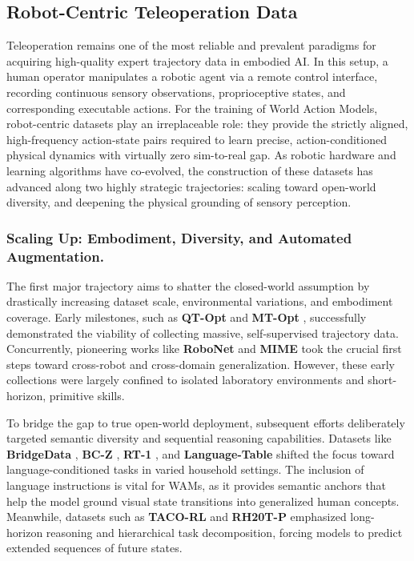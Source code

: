 \subsection{Robot-Centric Teleoperation Data}
\label{sec:data_robot}
Teleoperation remains one of the most reliable and prevalent paradigms for acquiring high-quality expert trajectory data in embodied AI. In this setup, a human operator manipulates a robotic agent via a remote control interface, recording continuous sensory observations, proprioceptive states, and corresponding executable actions. For the training of World Action Models, robot-centric datasets play an irreplaceable role: they provide the strictly aligned, high-frequency action-state pairs required to learn precise, action-conditioned physical dynamics with virtually zero sim-to-real gap. As robotic hardware and learning algorithms have co-evolved, the construction of these datasets has advanced along two highly strategic trajectories: scaling toward open-world diversity, and deepening the physical grounding of sensory perception.


\subsubsection{Scaling Up: Embodiment, Diversity, and Automated Augmentation.} 
The first major trajectory aims to shatter the closed-world assumption by drastically increasing dataset scale, environmental variations, and embodiment coverage. Early milestones, such as \textbf{QT-Opt} \cite{QT-Opt} and \textbf{MT-Opt} \cite{MT-Opt}, successfully demonstrated the viability of collecting massive, self-supervised trajectory data. Concurrently, pioneering works like \textbf{RoboNet} \cite{RoboNet} and \textbf{MIME} \cite{MIME} took the crucial first steps toward cross-robot and cross-domain generalization. However, these early collections were largely confined to isolated laboratory environments and short-horizon, primitive skills.

To bridge the gap to true open-world deployment, subsequent efforts deliberately targeted semantic diversity and sequential reasoning capabilities. Datasets like \textbf{BridgeData} \cite{Bridge}, \textbf{BC-Z} \cite{BC-Z}, \textbf{RT-1} \cite{RT-1}, and \textbf{Language-Table} \cite{Language-Table} shifted the focus toward language-conditioned tasks in varied household settings. The inclusion of language instructions is vital for WAMs, as it provides semantic anchors that help the model ground visual state transitions into generalized human concepts. Meanwhile, datasets such as \textbf{TACO-RL} \cite{TACO-RL-Real-World} and \textbf{RH20T-P} \cite{RH20T-P} emphasized long-horizon reasoning and hierarchical task decomposition, forcing models to predict extended sequences of future states. 

